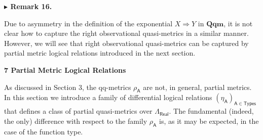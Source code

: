  
 
 
\par\medskip\noindent\textbf{$\blacktriangleright$ Remark 16.}\par
 
 
Due to asymmetry in the definition of the exponential $X\Rightarrow Y$ in $\mathbf{Qqm}$, it is not clear how to capture the right observational quasi-metrics in a similar manner. However, we will see that right observational quasi-metrics can be captured by partial metric logical relations introduced in the next section.\par
 
 
 


 
\par\medskip\noindent\textbf{7 Partial Metric Logical Relations}\par
 
 
As discussed in Section 3, the qq-metrics $\rho_{\mathsf{A}}$ are not, in general, partial metrics. In this section we introduce a family of differential logical relations $(\eta_{\mathsf{A}})_{\mathsf{A}\in\mathsf{Types}}$ that defines a class of partial quasi-metrics over $\Lambda_{\mathsf{Real}}$. The fundamental (indeed, the only) difference with respect to the family $\rho_{\mathsf{A}}$ is, as it may be expected, in the case of the function type.\par
 
 
 
